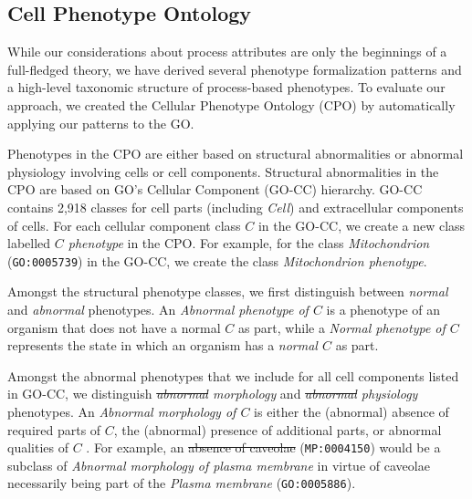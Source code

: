 \documentclass{bioinfo}
\renewcommand{\cite}{\citep}
\providecommand{\DIFadd}[1]{{\protect\color{blue}\uwave{#1}}} %
\providecommand{\DIFdel}[1]{{\protect\color{red}\sout{#1}}}                      %
\providecommand{\DIFaddbegin}{} %
\providecommand{\DIFaddend}{} %
\providecommand{\DIFdelbegin}{} %
\providecommand{\DIFdelend}{} %
\begin{document}
\subsection{Cell Phenotype Ontology}
While our considerations about process attributes are only the
beginnings of a full-fledged theory, we have derived several phenotype
formalization patterns and a high-level taxonomic structure of
process-based phenotypes. To evaluate our approach, we created the
Cellular Phenotype Ontology (CPO) by automatically applying our
patterns to the GO.

Phenotypes in the CPO are either based on structural abnormalities or
abnormal physiology involving cells or cell components. Structural
abnormalities in the CPO are based on GO's Cellular Component (GO-CC)
hierarchy. GO-CC contains 2,918 classes for cell parts (including {\em
  Cell}) and extracellular components of cells. For each cellular
component class $C$ in the GO-CC, we create a new class labelled {\em
  $C$ phenotype} in the CPO. For example, for the class {\em
  Mitochondrion} ({\tt GO:0005739}) in the GO-CC, we create the class
{\em Mitochondrion phenotype}.

Amongst the structural phenotype classes, we first distinguish between
{\em normal} and {\em abnormal} phenotypes. An {\em Abnormal phenotype
  of $C$} is a phenotype of an organism that does not have a normal
$C$ as part, while a {\em Normal phenotype of $C$} represents the
state in which an organism has a {\em normal $C$} as part.

Amongst the abnormal phenotypes that we include for all cell
components listed in GO-CC, we distinguish {\em \DIFdelbegin \DIFdel{abnormal }\DIFdelend \DIFaddbegin \DIFadd{Abnormal }\DIFaddend morphology}
and {\em \DIFdelbegin \DIFdel{abnormal }\DIFdelend \DIFaddbegin \DIFadd{Abnormal }\DIFaddend physiology} phenotypes. An {\em Abnormal morphology
  of $C$} is either the (abnormal) absence of required parts of $C$,
the (abnormal) presence of additional parts, or abnormal qualities of
$C$ \cite{Hoehndorf2010phene}. For example, an \DIFdelbegin \DIFdel{absence of
  caveolae}\DIFdelend \DIFaddbegin {\em \DIFadd{Absence of
  caveolae}} \DIFaddend ({\tt MP:0004150}) would be a subclass of {\em Abnormal
  morphology of plasma membrane} in virtue of caveolae necessarily
being part of the {\em Plasma membrane} ({\tt GO:0005886}).
\end{document}
